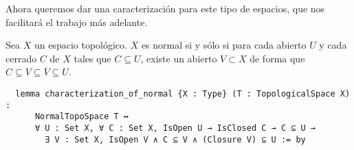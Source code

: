 Ahora queremos dar una caracterización para este tipo de espacios, que nos facilitará el trabajo más adelante.

\begin{proposition}\label{caracterizacion-normal}
  Sea $X$ un espacio topológico. $X$ es normal si y sólo si para cada abierto $U$ y cada cerrado $C$ de $X$ tales que $C \subseteq U$, existe un abierto $V \subset X$ de forma que $C \subseteq V \subseteq \overline{V} \subseteq U$.
\end{proposition}

\begin{lstlisting}
  lemma characterization_of_normal {X : Type} (T : TopologicalSpace X) :
      NormalTopoSpace T ↔
      ∀ U : Set X, ∀ C : Set X, IsOpen U → IsClosed C → C ⊆ U →
        ∃ V : Set X, IsOpen V ∧ C ⊆ V ∧ (Closure V) ⊆ U := by
\end{lstlisting}

